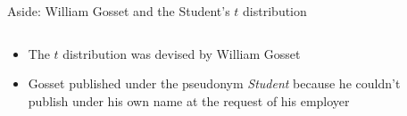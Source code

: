 \begin{frame}{Aside: William Gosset and the Student's $t$ distribution}
  \begin{columns}
    \begin{column}{0.65\textwidth}
      \begin{itemize}
        \item The $t$ distribution was devised by William Gosset
        \item Gosset published under the pseudonym \textit{Student} because he couldn't publish under his own name at the request of his employer
      \end{itemize}
    \end{column}~%
    \begin{column}{0.44\textwidth}
      \begin{overprint}

\end{overprint}
\end{column}
\end{columns}
\end{frame}
